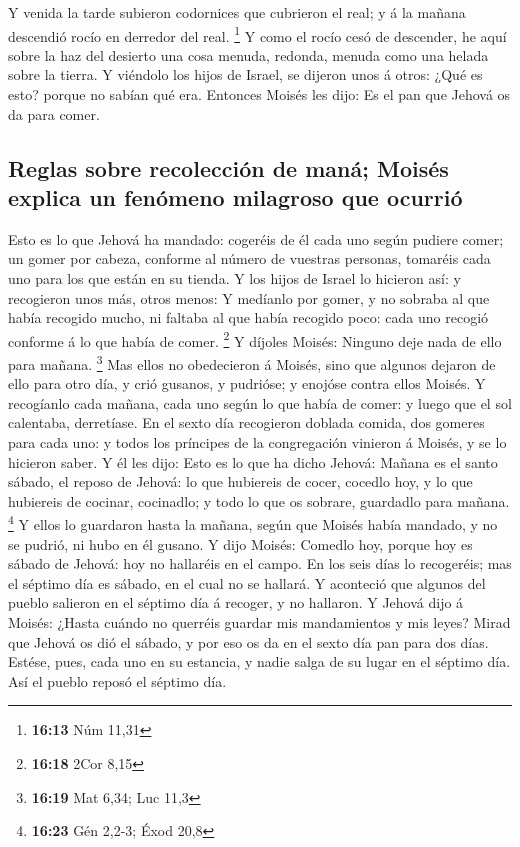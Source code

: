  Y venida la tarde subieron codornices que cubrieron el
real; y á la mañana descendió rocío en derredor del real. \footnote{\textbf{16:13}
  Núm 11,31}  Y como el rocío cesó de descender, he aquí
sobre la haz del desierto una cosa menuda, redonda, menuda como una
helada sobre la tierra.  Y viéndolo los hijos de Israel,
se dijeron unos á otros: ¿Qué es esto? porque no sabían qué era.
Entonces Moisés les dijo: Es el pan que Jehová os da para comer.

\hypertarget{reglas-sobre-recolecciuxf3n-de-manuxe1-moisuxe9s-explica-un-fenuxf3meno-milagroso-que-ocurriuxf3}{%
\subsection{Reglas sobre recolección de maná; Moisés explica un fenómeno
milagroso que
ocurrió}\label{reglas-sobre-recolecciuxf3n-de-manuxe1-moisuxe9s-explica-un-fenuxf3meno-milagroso-que-ocurriuxf3}}

 Esto es lo que Jehová ha mandado: cogeréis de él cada
uno según pudiere comer; un gomer por cabeza, conforme al número de
vuestras personas, tomaréis cada uno para los que están en su tienda.
 Y los hijos de Israel lo hicieron así: y recogieron unos
más, otros menos:  Y medíanlo por gomer, y no sobraba al
que había recogido mucho, ni faltaba al que había recogido poco: cada
uno recogió conforme á lo que había de comer. \footnote{\textbf{16:18}
  2Cor 8,15}  Y díjoles Moisés: Ninguno deje nada de ello
para mañana. \footnote{\textbf{16:19} Mat 6,34; Luc 11,3}
 Mas ellos no obedecieron á Moisés, sino que algunos
dejaron de ello para otro día, y crió gusanos, y pudrióse; y enojóse
contra ellos Moisés.  Y recogíanlo cada mañana, cada uno
según lo que había de comer: y luego que el sol calentaba, derretíase.
 En el sexto día recogieron doblada comida, dos gomeres
para cada uno: y todos los príncipes de la congregación vinieron á
Moisés, y se lo hicieron saber.  Y él les dijo: Esto es
lo que ha dicho Jehová: Mañana es el santo sábado, el reposo de Jehová:
lo que hubiereis de cocer, cocedlo hoy, y lo que hubiereis de cocinar,
cocinadlo; y todo lo que os sobrare, guardadlo para mañana. \footnote{\textbf{16:23}
  Gén 2,2-3; Éxod 20,8}  Y ellos lo guardaron hasta la
mañana, según que Moisés había mandado, y no se pudrió, ni hubo en él
gusano.  Y dijo Moisés: Comedlo hoy, porque hoy es sábado
de Jehová: hoy no hallaréis en el campo.  En los seis
días lo recogeréis; mas el séptimo día es sábado, en el cual no se
hallará.  Y aconteció que algunos del pueblo salieron en
el séptimo día á recoger, y no hallaron.  Y Jehová dijo á
Moisés: ¿Hasta cuándo no querréis guardar mis mandamientos y mis leyes?
 Mirad que Jehová os dió el sábado, y por eso os da en el
sexto día pan para dos días. Estése, pues, cada uno en su estancia, y
nadie salga de su lugar en el séptimo día.  Así el pueblo
reposó el séptimo día.

